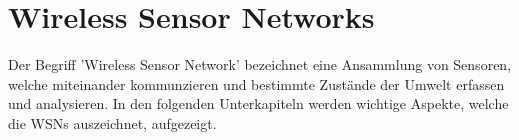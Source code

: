 \section{Wireless Sensor Networks}\label{s:WirelessSensorNetworks}

Der Begriff 'Wireless Sensor Network' bezeichnet eine Ansammlung von Sensoren, welche miteinander kommunzieren und bestimmte Zustände der Umwelt erfassen und analysieren. In den folgenden Unterkapiteln werden wichtige Aspekte, welche die WSNs auszeichnet, aufgezeigt.







